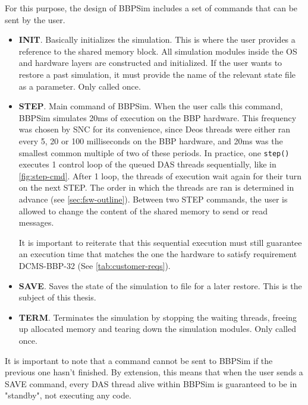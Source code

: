 {For this purpose, the design of BBPSim includes a set of commands that can be sent by the user. 
\begin{itemize}
	\item \textbf{INIT}. Basically initializes the simulation. This is where the user provides a reference to the shared memory block. All simulation modules inside the OS and hardware layers are constructed and initialized. If the user wants to restore a past simulation, it must provide the name of the relevant state file as a parameter. Only called once.
	\item \textbf{STEP}. Main command of BBPSim. When the user calls this command, BBPSim simulates 20ms of execution on the BBP hardware. This frequency was chosen by \gls{SNC} for its convenience, since Deos threads were either ran every 5, 20 or 100 milliseconds on the BBP hardware, and 20ms was the smallest common multiple of two of these periods.  In practice, one \texttt{step()} executes 1 control loop of the queued DAS threads sequentially, like in \autoref{fig:step-cmd}. After 1 loop, the threads of execution wait again for their turn on the next STEP. The order in which the threads are ran is determined in advance (see \autoref{sec:fsw-outline}). Between two STEP commands, the user is allowed to change the content of the shared memory to send or read messages. \par
	\begin{minipage}{\linewidth}
		\vspace{12pt}
		\centering
		
		\label{fig:step-cmd}
		\vspace{12pt}
	\end{minipage}
	It is important to reiterate that this sequential execution must still guarantee an execution time that matches the one the hardware to satisfy requirement DCMS-BBP-32 (See \autoref{tab:customer-reqs}).
	\item \textbf{SAVE}. Saves the state of the simulation to file for a later restore. This is the subject of this thesis. 
	\item \textbf{TERM}. Terminates the simulation by stopping the waiting threads, freeing up allocated memory and tearing down the simulation modules. Only called once.
\end{itemize}
It is important to note that a command cannot be sent to BBPSim if the previous one hasn't finished. By extension, this means that when the user sends a SAVE command, every DAS thread alive within BBPSim is guaranteed to be in "standby", not executing any code. 

}
